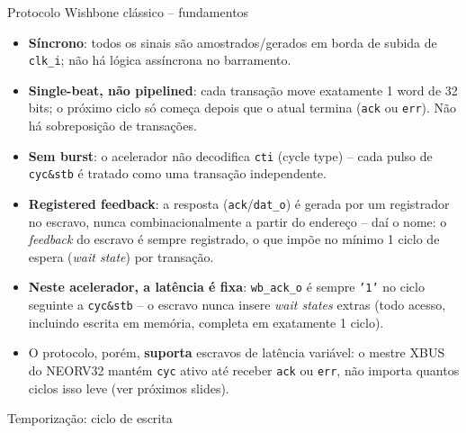 \documentclass[aspectratio=169,10pt]{beamer}
\begin{document}
\begin{frame}{Protocolo Wishbone clássico -- fundamentos}
  \begin{itemize}
    \item \textbf{Síncrono}: todos os sinais são amostrados/gerados em borda de subida
      de \texttt{clk\_i}; não há lógica assíncrona no barramento.
    \item \textbf{Single-beat, não pipelined}: cada transação move exatamente 1 word
      de 32 bits; o próximo ciclo só começa depois que o atual termina
      (\texttt{ack} ou \texttt{err}). Não há sobreposição de transações.
    \item \textbf{Sem burst}: o acelerador não decodifica \texttt{cti} (cycle type) --
      cada pulso de \texttt{cyc\&stb} é tratado como uma transação independente.
    \item \textbf{Registered feedback}: a resposta (\texttt{ack}/\texttt{dat\_o}) é
      gerada por um registrador no escravo, nunca combinacionalmente a partir do
      endereço -- daí o nome: o \emph{feedback} do escravo é sempre registrado,
      o que impõe no mínimo 1 ciclo de espera (\emph{wait state}) por transação.
    \item \textbf{Neste acelerador, a latência é fixa}: \texttt{wb\_ack\_o} é
      sempre \texttt{'1'} no ciclo seguinte a \texttt{cyc\&stb} -- o escravo nunca
      insere \emph{wait states} extras (todo acesso, incluindo escrita em
      memória, completa em exatamente 1 ciclo).
    \item O protocolo, porém, \textbf{suporta} escravos de latência variável: o
      mestre XBUS do NEORV32 mantém \texttt{cyc} ativo até receber \texttt{ack}
      ou \texttt{err}, não importa quantos ciclos isso leve (ver próximos slides).
  \end{itemize}
\end{frame}

\begin{frame}{Temporização: ciclo de escrita}
  \centering
\end{frame}
\end{document}
